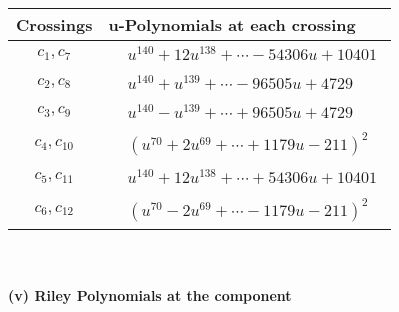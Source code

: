 \documentclass[1p]{elsarticle_modified}
\theoremstyle{definition}
\begin{document}
\begin{tabular}{m{50pt}|m{274pt}}
Crossings & \hspace{64pt}u-Polynomials at each crossing \\
\hline $$\begin{aligned}c_{1},c_{7}\end{aligned}$$&$\begin{aligned}
&u^{140}+12 u^{138}+\cdots-54306 u+10401
\end{aligned}$\\
\hline $$\begin{aligned}c_{2},c_{8}\end{aligned}$$&$\begin{aligned}
&u^{140}+u^{139}+\cdots-96505 u+4729
\end{aligned}$\\
\hline $$\begin{aligned}c_{3},c_{9}\end{aligned}$$&$\begin{aligned}
&u^{140}- u^{139}+\cdots+96505 u+4729
\end{aligned}$\\
\hline $$\begin{aligned}c_{4},c_{10}\end{aligned}$$&$\begin{aligned}
&(u^{70}+2 u^{69}+\cdots+1179 u-211)^{2}
\end{aligned}$\\
\hline $$\begin{aligned}c_{5},c_{11}\end{aligned}$$&$\begin{aligned}
&u^{140}+12 u^{138}+\cdots+54306 u+10401
\end{aligned}$\\
\hline $$\begin{aligned}c_{6},c_{12}\end{aligned}$$&$\begin{aligned}
&(u^{70}-2 u^{69}+\cdots-1179 u-211)^{2}
\end{aligned}$\\
\hline
\end{tabular}\\~\\
\newpage\renewcommand{\arraystretch}{1}
\flushleft \textbf{(v) Riley Polynomials at the component}\newline \\
\end{document}
